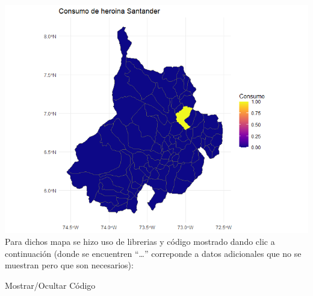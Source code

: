 \documentclass[
]{article}
\begin{document}
\includegraphics{images/Mapa consumo de heroina en santander.png}\\
Para dichos mapa se hizo uso de librerias y código mostrado dando clic a
continuación (donde se encuentren ``\ldots{}'' correponde a datos
adicionales que no se muestran pero que son necesarios):

Mostrar/Ocultar Código
\end{document}
